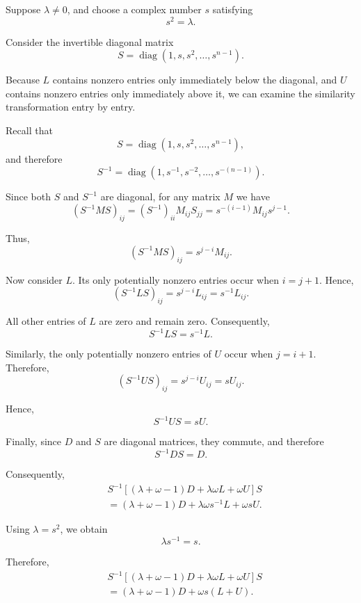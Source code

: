 \documentclass[11pt,a4paper]{article}
\theoremstyle{definition}
\theoremstyle{remark}
\begin{document}
Suppose $\lambda\neq0$, and choose a complex
number $s$ satisfying
\[
    s^2=\lambda.
\]

Consider the invertible diagonal matrix
\[
    S=
    \operatorname{diag}
    (1,s,s^2,\ldots,s^{n-1}).
\]


Because $L$ contains nonzero entries only immediately
below the diagonal, and $U$ contains nonzero entries
only immediately above it, we can examine the
similarity transformation entry by entry.

Recall that
\[
S=\operatorname{diag}(1,s,s^2,\ldots,s^{n-1}),
\]
and therefore
\[
S^{-1}=\operatorname{diag}
(1,s^{-1},s^{-2},\ldots,s^{-(n-1)}).
\]

Since both $S$ and $S^{-1}$ are diagonal, for any
matrix $M$ we have
\[
(S^{-1}MS)_{ij}
=
(S^{-1})_{ii}M_{ij}S_{jj}
=
s^{-(i-1)}M_{ij}s^{j-1}.
\]

Thus,
\begin{equation}
\boxed{
(S^{-1}MS)_{ij}=s^{j-i}M_{ij}.
}
\end{equation}

Now consider $L$. Its only potentially nonzero
entries occur when $i=j+1$. Hence,
\[
(S^{-1}LS)_{ij}
=
s^{j-i}L_{ij}
=
s^{-1}L_{ij}.
\]

All other entries of $L$ are zero and remain zero.
Consequently,
\[
\boxed{S^{-1}LS=s^{-1}L.}
\]

Similarly, the only potentially nonzero entries
of $U$ occur when $j=i+1$. Therefore,
\[
(S^{-1}US)_{ij}
=
s^{j-i}U_{ij}
=
sU_{ij}.
\]

Hence,
\[
\boxed{S^{-1}US=sU.}
\]

Finally, since $D$ and $S$ are diagonal matrices,
they commute, and therefore
\[
\boxed{S^{-1}DS=D.}
\]



Consequently,
\[
\begin{aligned}
&S^{-1}
\left[
(\lambda+\omega-1)D
+\lambda\omega L+\omega U
\right]S
\\[4pt]
&=
(\lambda+\omega-1)D
+\lambda\omega s^{-1}L
+\omega sU.
\end{aligned}
\]

Using $\lambda=s^2$, we obtain
\[
    \lambda s^{-1}=s.
\]

Therefore,
\[
\begin{aligned}
&S^{-1}
\left[
(\lambda+\omega-1)D
+\lambda\omega L+\omega U
\right]S
\\
&=
(\lambda+\omega-1)D
+\omega s(L+U).
\end{aligned}
\]
\end{document}
